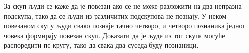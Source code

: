 \problem
За скуп људи се каже да је повезан ако се не може разложити на два непразна
подскупа, тако да се људи из различитих подскупова не познају.
У неком повезаном скупу људи свако познаје тачно четворо, и четворо познаника
једног човека формирају повезан скуп.
Доказати да је људе из тог скупа могуће распоредити по кругу, тако да свака два
суседа буду познаници.

\solution

\endproblem
